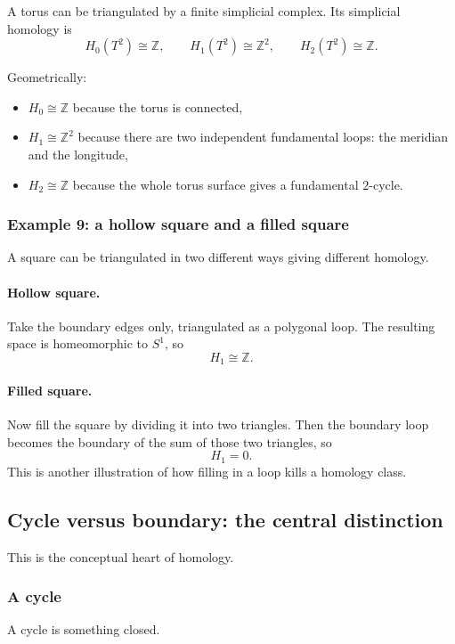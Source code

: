 \documentclass[12pt,a4paper]{article}
\theoremstyle{notespace}
\begin{document}
A torus can be triangulated by a finite simplicial complex. Its simplicial homology is
\[
H_0(T^2)\cong \mathbb{Z},\qquad
H_1(T^2)\cong \mathbb{Z}^2,\qquad
H_2(T^2)\cong \mathbb{Z}.
\]

Geometrically:
\begin{itemize}
	\item \(H_0\cong \mathbb{Z}\) because the torus is connected,
	\item \(H_1\cong \mathbb{Z}^2\) because there are two independent fundamental loops: the meridian and the longitude,
	\item \(H_2\cong \mathbb{Z}\) because the whole torus surface gives a fundamental \(2\)-cycle.
\end{itemize}

\subsubsection{Example 9: a hollow square and a filled square}

A square can be triangulated in two different ways giving different homology.

\paragraph{Hollow square.}
Take the boundary edges only, triangulated as a polygonal loop. The resulting space is homeomorphic to \(S^1\), so
\[
H_1\cong \mathbb{Z}.
\]

\paragraph{Filled square.}
Now fill the square by dividing it into two triangles. Then the boundary loop becomes the boundary of the sum of those two triangles, so
\[
H_1=0.
\]
This is another illustration of how filling in a loop kills a homology class.

\subsection{Cycle versus boundary: the central distinction}

This is the conceptual heart of homology.

\subsubsection{A cycle}

A cycle is something closed.
\end{document}
